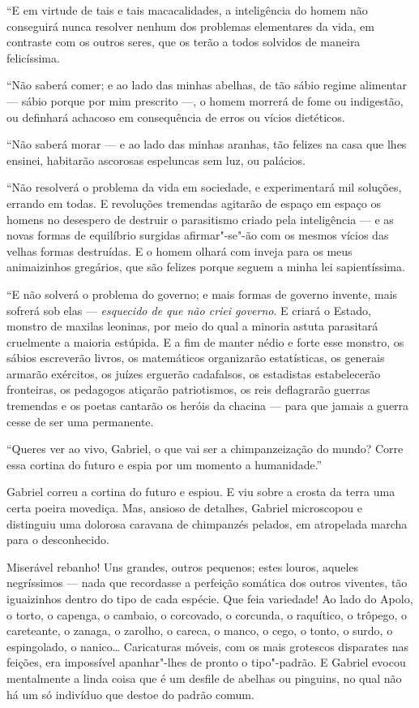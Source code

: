 ``E em virtude de tais e tais macacalidades, a inteligência do homem não
conseguirá nunca resolver nenhum dos problemas elementares da vida, em
contraste com os outros seres, que os terão a todos solvidos de maneira
felicíssima.

``Não saberá comer; e ao lado das minhas abelhas, de tão sábio regime
alimentar --- sábio porque por mim prescrito ---, o homem morrerá de
fome ou indigestão, ou definhará achacoso em consequência de erros ou
vícios dietéticos.

``Não saberá morar --- e ao lado das minhas aranhas, tão felizes na casa
que lhes ensinei, habitarão ascorosas espeluncas sem luz, ou palácios.

``Não resolverá o problema da vida em sociedade, e experimentará mil
soluções, errando em todas. E revoluções tremendas agitarão de espaço em
espaço os homens no desespero de destruir o parasitismo criado pela
inteligência --- e as novas formas de equilíbrio surgidas afirmar"-se"-ão
com os mesmos vícios das velhas formas destruídas. E o homem olhará com
inveja para os meus animaizinhos gregários, que são felizes porque
seguem a minha lei sapientíssima.

``E não solverá o problema do governo; e mais formas de governo invente,
mais sofrerá sob elas --- \emph{esquecido de que não criei governo}. E
criará o Estado, monstro de maxilas leoninas, por meio do qual a minoria
astuta parasitará cruelmente a maioria estúpida. E a fim de manter nédio
e forte esse monstro, os sábios escreverão livros, os matemáticos
organizarão estatísticas, os generais armarão exércitos, os juízes
erguerão cadafalsos, os estadistas estabelecerão fronteiras, os
pedagogos atiçarão patriotismos, os reis deflagrarão guerras tremendas e
os poetas cantarão os heróis da chacina --- para que jamais a guerra
cesse de ser uma permanente.

``Queres ver ao vivo, Gabriel, o que vai ser a chimpanzeização do mundo?
Corre essa cortina do futuro e espia por um momento a humanidade.''

Gabriel correu a cortina do futuro e espiou. E viu sobre a crosta da
terra uma certa poeira movediça. Mas, ansioso de detalhes, Gabriel
microscopou e distinguiu uma dolorosa caravana de chimpanzés pelados, em
atropelada marcha para o desconhecido.

Miserável rebanho! Uns grandes, outros pequenos; estes louros, aqueles
negríssimos --- nada que recordasse a perfeição somática dos outros
viventes, tão iguaizinhos dentro do tipo de cada espécie. Que feia
variedade! Ao lado do Apolo, o torto, o capenga, o cambaio, o corcovado,
o corcunda, o raquítico, o trôpego, o careteante, o zanaga, o zarolho, o
careca, o manco, o cego, o tonto, o surdo, o espingolado, o nanico\ldots{}
Caricaturas móveis, com os mais grotescos disparates nas feições, era
impossível apanhar"-lhes de pronto o tipo"-padrão. E Gabriel evocou
mentalmente a linda coisa que é um desfile de abelhas ou pinguins, no
qual não há um só indivíduo que destoe do padrão comum.

